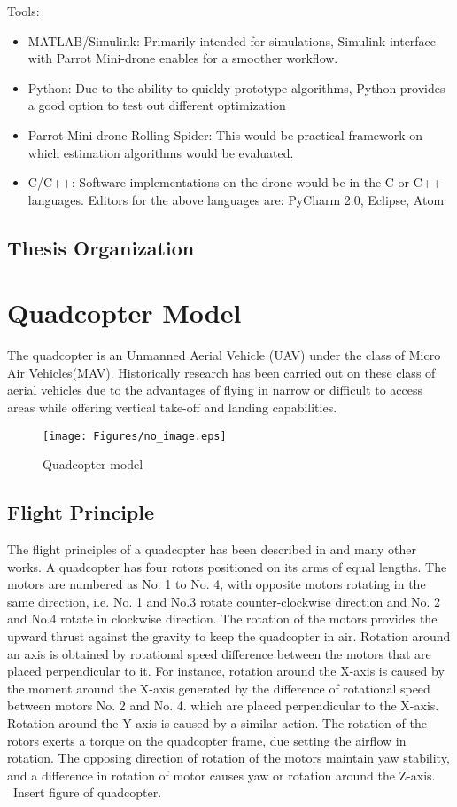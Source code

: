 \documentclass{article}
\begin{document}
Tools: 
\begin{itemize}
\item MATLAB/Simulink: Primarily intended for simulations, Simulink interface with Parrot Mini-drone enables for a smoother workflow.
\item Python: Due to the ability to quickly prototype algorithms, Python provides a good option to test out different optimization
\item Parrot Mini-drone Rolling Spider: This would be practical framework on which estimation algorithms would be evaluated. 
\item C/C++: Software implementations on the drone would be in the C or C++ languages. 
Editors for the above languages are: PyCharm 2.0, Eclipse, Atom
\end{itemize}

\subsection{Thesis Organization}


\section{Quadcopter Model}
The quadcopter is an Unmanned Aerial Vehicle (UAV) under the class of Micro Air Vehicles(MAV). Historically research has been carried out on these class of aerial vehicles due to the advantages of flying in narrow or difficult to access areas while offering vertical take-off and landing capabilities. 
\begin{figure}[H]
\centering
\texttt{[image: Figures/no\_image.eps]}
\caption{Quadcopter model}
\label{quad_red_balls}
\end{figure}

\subsection{Flight Principle}
The flight principles of a quadcopter has been described in \cite{RN71} and many other works.
A quadcopter has four rotors positioned on its arms of equal lengths. The motors are numbered as No. 1 to No. 4, with opposite motors rotating in the same direction, i.e. No. 1 and No.3 rotate counter-clockwise direction and No. 2 and No.4 rotate in clockwise direction. The rotation of the motors provides the upward thrust against the gravity to keep the quadcopter in air. Rotation around an axis is obtained by rotational speed difference between the motors that are placed perpendicular to it. For instance, rotation around the X-axis is caused by the moment around the X-axis generated by the difference of rotational speed between motors No. 2 and No. 4. which are placed perpendicular to the X-axis. Rotation around the Y-axis is caused by a similar action. The rotation of the rotors exerts a torque on the quadcopter frame, due setting the airflow in rotation. The opposing direction of rotation of the motors maintain yaw stability, and a difference in rotation of motor causes yaw or rotation around the Z-axis.\\\ Insert figure of quadcopter.
\end{document}
